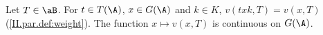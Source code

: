 Let $T\in\aB$. For $t\in T(\A)$, $x\in G(\A)$ and $k\in K$, $v(txk,T)=v(x,T)$ (\cref{II.par.def:weight}). The function $x\mapsto v(x,T)$ is continuous on
$G(\A)$.

